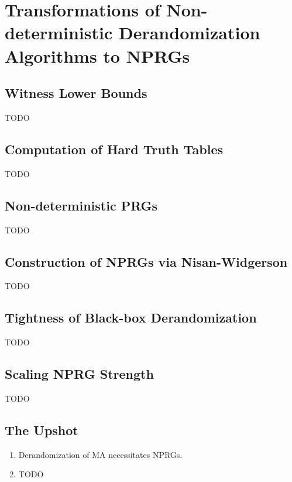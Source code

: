 \chapter{Transformations of Non-deterministic Derandomization Algorithms to NPRGs}
\label{lec:13}

\section{Witness Lower Bounds}

TODO

\section{Computation of Hard Truth Tables}

TODO

\section{Non-deterministic PRGs}

TODO

\section{Construction of NPRGs via Nisan-Widgerson}

TODO

\section{Tightness of Black-box Derandomization}

TODO

\section{Scaling NPRG Strength}

TODO

\section*{The Upshot}

\begin{enumerate}
  \item Derandomization of MA necessitates NPRGs.
  \item TODO
\end{enumerate}
